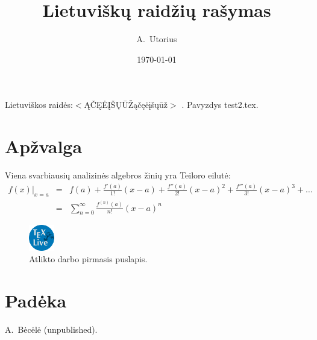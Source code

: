 \documentclass{article}
\begin{document}
\author{A.\ Utorius}
\title{Lietuvi{\v s}kų raid{\v z}ių ra{\v s}ymas}
\date{\today}

\maketitle

Lietuviškos raid{\.e}s:$<$ĄČĘĖĮŠŲŪŽąčęėįšųūž$>$ \cite{ref1}.
Pavyzdys {\sf test2.tex}.

\section{Apžvalga}

Viena svarbiausių analizinės algebros žinių yra Teiloro eilutė:
\begin{align}
f(x)\big|_{x=a} &=& f(a)
 + \frac{f'(a)}{1!} (x-a)
 + \frac{f''(a)}{2!} (x-a)^2
 + \frac{f'''(a)}{3!} (x-a)^3
 + \dots \nonumber \\
 &=& \sum\limits_{n=0}^{\infty} \frac{f^{(n)}(a)}{n!} (x-a)^n
\end{align}

\begin{figure}[b]
\includegraphics[height=0.1\textheight,width=0.1\textwidth]{texlive.png}
\caption{Atlikto darbo pirmasis puslapis.}
\label{fig-report}
\end{figure}

\section*{Padėka}

\textit{}

\begin{thebibliography}{99}
 A.\ Bėcėlė (unpublished).
\end{thebibliography}
\end{document}
